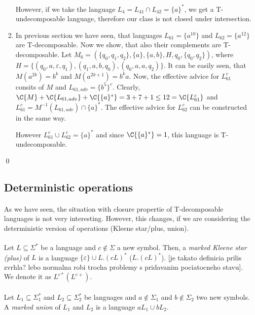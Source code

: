 \begin{enumerate}
However, if we take the language $L_4 = L_{41} \cap L_{42} = \{ a\}^*$, we get a T-undecomposable language, therefore our class is not closed under intersection.

\item In previous section we have seen, that languages $L_{61} = \{a^{10}\}$ and $L_{62}=\{a^{12}\}$ are T-decomposable. Now we show, that also their complements are T-decomposable. Let $M_6 =(\{q_0,q_1,q_2\}, \{a\},\{a,b\},H,q_0,\{q_0,q_2\})$, where $H = \{(q_0,a,\varepsilon,q_1),\allowbreak (q_1,a,b,q_0),\allowbreak (q_0,a,a,q_2)\}$. It can be easily seen, that $M(a^{2k}) = b^k$ and $M(a^{2k+1}) = b^ka$. Now, the effective advice for $L_{61}^c$ consits of $M$ and $L_{61,adv} = \{b^5\}^c$. Clearly, $\C{M} + \C{L_{61,adv}} + \C{\{a\}^*} = 3+7+1 \leq 12 = \C{L_{61}^c}$ and $L_{61}^c = M^{-1}(L_{61,adv}) \cap \{a\}^*$. The effective advice for $L_{62}^c$ can be constructed in the same way.

However $L_{61}^c \cup L_{62}^c = \{a\}^*$ and since $\C{\{a\}^*} = 1$, this language is T-undecomposable.
\end{enumerate} \qed

\subsection{Deterministic operations}
\paragraph{}
As we have seen, the situation with closure propertie of T-decomposable languages is not very interesting. However, this changes, if we are considering the deterministic version of operations (Kleene star/plus, union).

\paragraph{}
 Let $L \subseteq \Sigma^*$ be a language and $c \notin \Sigma$ a new symbol. Then, a \emph{marked Kleene star (plus)} of $L$ is a language $\{ \varepsilon \} \cup L.(cL)^*$ ($L.(cL)^*$). \color{red}[je takato definicia prilis zvrhla? lebo normalna robi trocha problemy s pridavanim pociatocneho stavu]\color{black}. We denote it as $L^{c*} (L^{c+})$.

\paragraph{}
 Let $L_1 \subseteq \Sigma_1^*$ and $L_2 \subseteq \Sigma_2^*$ be languages and $a \notin \Sigma_1$ and $b \notin \Sigma_2$ two new symbols. A \emph{marked union} of $L_1$ and $L_2$ is a language $aL_1 \cup bL_2$.

